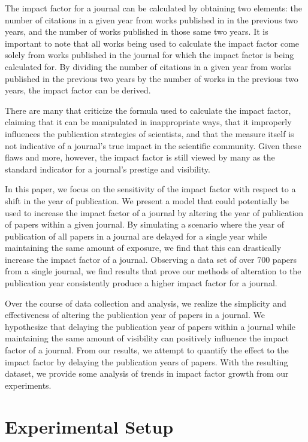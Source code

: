 \documentclass[jair,twoside,11pt,theapa]{article}
\begin{document}
The impact factor for a journal can be calculated by obtaining two elements: the number of citations in a given year from works published in in the previous two years, and the number of works published in those same two years. It is important to note that all works being used to calculate the impact factor come solely from works published in the journal for which the impact factor is being calculated for. By dividing the number of citations in a given year from works published in the previous two years by the number of works in the previous two years, the impact factor can be derived.

There are many that criticize the formula used to calculate the impact factor, claiming that it can be manipulated in inappropriate ways, that it improperly influences the publication strategies of scientists, and that the measure itself is not indicative of a journal’s true impact in the scientific community. Given these flaws and more, however, the impact factor is still viewed by many as the standard indicator for a journal’s prestige and visibility.

In this paper, we focus on the sensitivity of the impact factor with respect to a shift in the year of publication. We present a model that could potentially be used to increase the impact factor of a journal by altering the year of publication of papers within a given journal. By simulating a scenario where the year of publication of all papers in a journal are delayed for a single year while maintaining the same amount of exposure, we find that this can drastically increase the impact factor of a journal. Observing a data set of over 700 papers from a single journal, we find results that prove our methods of alteration to the publication year consistently produce a higher impact factor for a journal. 

Over the course of data collection and analysis, we realize the simplicity and effectiveness of altering the publication year of papers in a journal. We hypothesize that delaying the publication year of papers within a journal while maintaining the same amount of visibility can positively influence the impact factor of a journal. From our results, we attempt to quantify the effect to the impact factor by delaying the publication years of papers. With the resulting dataset, we provide some analysis of trends in impact factor growth from our experiments.


\section{Experimental Setup}
\end{document}
